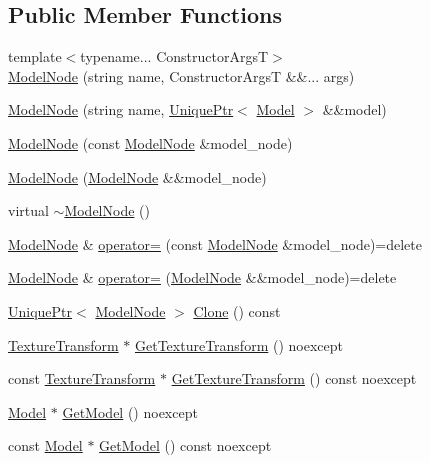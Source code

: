 \subsection*{Public Member Functions}
\begin{DoxyCompactItemize}
\item 
{\footnotesize template$<$typename... Constructor\+ArgsT$>$ }\\\hyperlink{classmage_1_1_model_node_a588aa714637e3e17e764e08c9035bf60}{Model\+Node} (string name, Constructor\+ArgsT \&\&... args)
\item 
\hyperlink{classmage_1_1_model_node_a46f63c13878130126a4b25fdb568ac37}{Model\+Node} (string name, \hyperlink{namespacemage_a3316d7143a973e37adf1110f2e80ca31}{Unique\+Ptr}$<$ \hyperlink{classmage_1_1_model}{Model} $>$ \&\&model)
\item 
\hyperlink{classmage_1_1_model_node_a409c098ddecf20d1b393d43c15d16482}{Model\+Node} (const \hyperlink{classmage_1_1_model_node}{Model\+Node} \&model\+\_\+node)
\item 
\hyperlink{classmage_1_1_model_node_a19ba577112ea488f227ea31642fb2cb2}{Model\+Node} (\hyperlink{classmage_1_1_model_node}{Model\+Node} \&\&model\+\_\+node)
\item 
virtual \hyperlink{classmage_1_1_model_node_a131c0062a1bed3d29fade27e602bec44}{$\sim$\+Model\+Node} ()
\item 
\hyperlink{classmage_1_1_model_node}{Model\+Node} \& \hyperlink{classmage_1_1_model_node_ad8378279b79930dfe98d176dbc1c5db9}{operator=} (const \hyperlink{classmage_1_1_model_node}{Model\+Node} \&model\+\_\+node)=delete
\item 
\hyperlink{classmage_1_1_model_node}{Model\+Node} \& \hyperlink{classmage_1_1_model_node_ad39321f4d392aa4e28169b8d7a08af68}{operator=} (\hyperlink{classmage_1_1_model_node}{Model\+Node} \&\&model\+\_\+node)=delete
\item 
\hyperlink{namespacemage_a3316d7143a973e37adf1110f2e80ca31}{Unique\+Ptr}$<$ \hyperlink{classmage_1_1_model_node}{Model\+Node} $>$ \hyperlink{classmage_1_1_model_node_a766f90e1d626c455ba552a3ded08b948}{Clone} () const
\item 
\hyperlink{classmage_1_1_texture_transform}{Texture\+Transform} $\ast$ \hyperlink{classmage_1_1_model_node_aa5b732d1ad0f3d2ff8549731708fd63c}{Get\+Texture\+Transform} () noexcept
\item 
const \hyperlink{classmage_1_1_texture_transform}{Texture\+Transform} $\ast$ \hyperlink{classmage_1_1_model_node_a3686306f587abaa353450c45dd508dc4}{Get\+Texture\+Transform} () const noexcept
\item 
\hyperlink{classmage_1_1_model}{Model} $\ast$ \hyperlink{classmage_1_1_model_node_a8964223fd592fd23949d6f996c40a482}{Get\+Model} () noexcept
\item 
const \hyperlink{classmage_1_1_model}{Model} $\ast$ \hyperlink{classmage_1_1_model_node_ad8c4978c4d14ed015fdb517ba86ebd93}{Get\+Model} () const noexcept
\end{DoxyCompactItemize}
